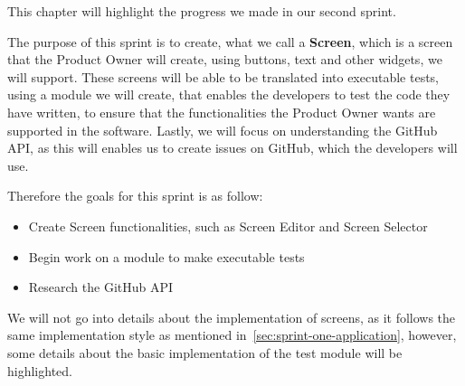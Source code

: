 This chapter will highlight the progress we made in our second sprint.

The purpose of this sprint is to create, what we call a \textbf{Screen}, which is a screen that the Product Owner will create, using buttons, text and other widgets, we will support.
These screens will be able to be translated into executable tests, using a module we will create, that enables the developers to test the code they have written, to ensure that the functionalities the Product Owner wants are supported in the software.
Lastly, we will focus on understanding the GitHub API, as this will enables us to create issues on GitHub, which the developers will use.

Therefore the goals for this sprint is as follow:

\begin{itemize}
    \item Create Screen functionalities, such as Screen Editor and Screen Selector
    \item Begin work on a module to make executable tests
    \item Research the GitHub API
\end{itemize}

We will not go into details about the implementation of screens, as it follows the same implementation style as mentioned in~\autoref{sec:sprint-one-application}, however, some details about the basic implementation of the test module will be highlighted.
